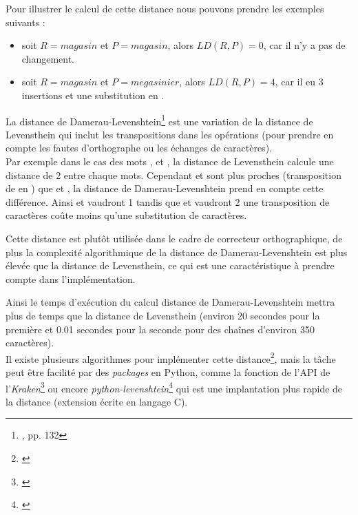 Pour illustrer le calcul de cette distance nous pouvons prendre les exemples suivants :

\begin{itemize}
    \item soit $R = magasin$ et $P= magasin$, alors $LD(R, P) = 0$, car il n'y a pas de changement.
    \item soit $R = magasin$ et $P= megasinier $, alors $LD(R, P) = 4$, car il eu 3 insertions  et une substitution  en . 
\end{itemize} 
\bigskip
La distance de Damerau-Levenshtein\footnote{\cite{chaumartin_traitement_2020}, pp. 132} est une variation de la distance de Levensthein qui inclut les transpositions dans les opérations (pour prendre en compte les fautes d'orthographe ou les échanges de caractères).\\ 

Par exemple dans le cas des mots ,  et , la distance de Levensthein calcule une distance de 2 entre chaque mots. Cependant  et  sont plus proches (transposition de  en ) que  et , la distance de Damerau-Levenshtein prend en compte cette différence. Ainsi  et  vaudront 1 tandis que  et  vaudront 2 une transposition de caractères coûte moins qu'une substitution de caractères. 

Cette distance est plutôt utilisée dans le cadre de correcteur orthographique, de plus la complexité algorithmique de la distance de Damerau-Levenshtein est plus élevée que la distance de Levensthein, ce qui est une caractéristique à prendre compte dans l'implémentation. 

Ainsi le temps d'exécution du calcul distance de Damerau-Levenshtein mettra plus de temps que la distance de Levensthein (environ 20 secondes pour la première et 0.01 secondes pour la seconde pour des chaînes d'environ 350 caractères).\\

Il existe plusieurs algorithmes pour implémenter cette distance\footnote{\cite{noauthor_algorithm_nodate}}, mais la tâche peut être facilité par des \textit{packages} en Python, comme la fonction  de l'API de l'\textit{Kraken}\footnote{\cite{noauthor_kraken_nodate}} ou encore  \textit{python-levenshtein}\footnote{\cite{noauthor_python-levenshtein_nodate}} qui est une implantation plus rapide de la distance (extension écrite en langage C).\\

